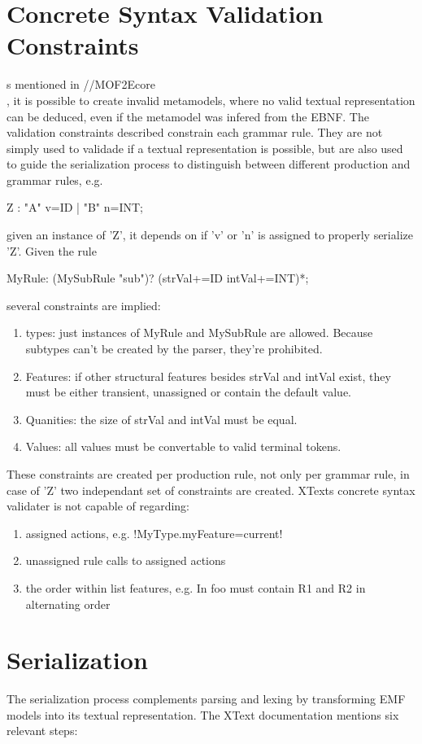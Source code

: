 \section{Concrete Syntax Validation Constraints}
s mentioned in //MOF2Ecore\\, it is possible to create invalid metamodels, where no valid textual representation can be deduced, even if the metamodel was infered from the EBNF. The validation constraints described constrain each grammar rule. They are not simply used to validade if a textual representation is possible, but are also used to guide the serialization process to distinguish between different production and grammar rules, e.g.
\begin{xtxt}
Z 	:  "A" v=ID  
	|  "B" n=INT;
\end{xtxt}
given an instance of 'Z', it depends on if 'v' or 'n' is assigned to properly serialize 'Z'.
Given the rule
\begin{xtxt}
MyRule:	({MySubRule} "sub")? (strVal+=ID intVal+=INT)*;
\end{xtxt}
several constraints are implied:
\begin{enumerate}
	\item types: just instances of MyRule and MySubRule are allowed. Because subtypes can't be created by the parser, they're prohibited. 
	\item Features: if other structural features besides strVal and intVal exist, they must be either transient, unassigned or contain the default value.
	\item Quanities: the size of strVal and intVal must be equal.
	\item Values: all values must be convertable to valid terminal tokens.
\end{enumerate}
These constraints are created per production rule, not only per grammar rule, in case of 'Z' two independant set of constraints are created.
XTexts concrete syntax validater is not capable of regarding:
\begin{enumerate}
	\item assigned actions, e.g. 
	\kode!{MyType.myFeature=current}!
	\item unassigned rule calls to assigned actions
	\item the order within list features, e.g. In  foo must contain R1 and R2 in alternating order
\end{enumerate}

\section{Serialization}
The serialization process complements parsing and lexing by transforming EMF models into its textual representation. The XText documentation mentions six relevant steps:

